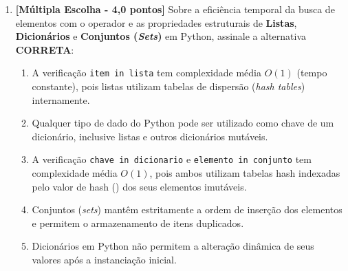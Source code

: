 \begin{enumerate}[label=\textbf{Q\arabic*.}, start=1]
\begin{verbatim}
lista_b.append(40)
lista_c.append(50)
\end{verbatim}
Quais serão os valores finais de ,  e , respectivamente?

\begin{enumerate}[label=\textbf{(\Alph*)}]
    \item \texttt{[10, 20, 30]}, \texttt{[10, 20, 30, 40]} e \texttt{[10, 20, 30, 50]}
    \item \texttt{[10, 20, 30, 40, 50]}, \texttt{[10, 20, 30, 40, 50]} e \texttt{[10, 20, 30, 50]}
    \item \texttt{[10, 20, 30]}, \texttt{[10, 20, 30, 40]} e \texttt{[10, 20, 30]}
    \item \texttt{[10, 20, 30, 40]}, \texttt{[10, 20, 30, 40]} e \texttt{[10, 20, 30, 50]}
    \item \texttt{[10, 20, 30, 50]}, \texttt{[10, 20, 30, 40]} e \texttt{[10, 20, 30, 50]}
\end{enumerate}



\vspace{0.4cm}

\item \textbf{[Múltipla Escolha - 4,0 pontos]} Sobre a eficiência temporal da busca de elementos com o operador  e as propriedades estruturais de \textbf{Listas}, \textbf{Dicionários} e \textbf{Conjuntos (\emph{Sets})} em Python, assinale a alternativa \textbf{CORRETA}:

\begin{enumerate}[label=\textbf{(\Alph*)}]
    \item A verificação \texttt{item in lista} tem complexidade média $O(1)$ (tempo constante), pois listas utilizam tabelas de dispersão (\emph{hash tables}) internamente.
    \item Qualquer tipo de dado do Python pode ser utilizado como chave de um dicionário, inclusive listas e outros dicionários mutáveis.
    \item A verificação \texttt{chave in dicionario} e \texttt{elemento in conjunto} tem complexidade média $O(1)$, pois ambos utilizam tabelas hash indexadas pelo valor de hash () dos seus elementos imutáveis.
    \item Conjuntos (\emph{sets}) mantêm estritamente a ordem de inserção dos elementos e permitem o armazenamento de itens duplicados.
    \item Dicionários em Python não permitem a alteração dinâmica de seus valores após a instanciação inicial.
\end{enumerate}


\end{enumerate}
